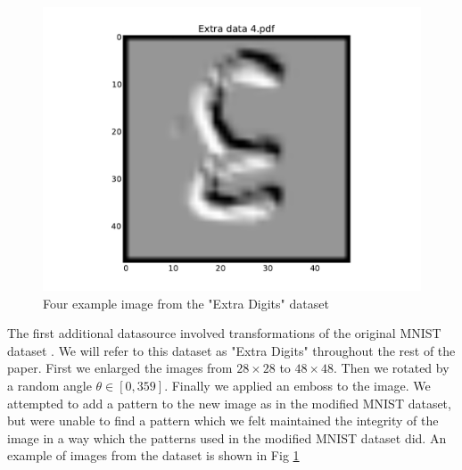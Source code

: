 \documentclass[conference]{IEEEtran}
\begin{document}
\begin{figure}[h]
	\includegraphics[scale=0.20]{Extradata4.pdf}
	\caption{Four example image from the "Extra Digits" dataset}
	\label{ExtraData}
\end{figure}

The first additional datasource involved transformations of the original MNIST dataset \cite{MNIST_Original}. We will refer to this dataset as "Extra Digits" throughout the rest of the paper. First we enlarged the images from $28\times 28$ to $48\times 48$. Then we rotated by a random angle $\theta \in  [0,359]$. Finally we applied an emboss to the image. We attempted to add a pattern to the new image as in the modified MNIST dataset, but were unable to find a pattern which we felt maintained the integrity of the image in a way which the patterns used in the modified MNIST dataset did. An example of images from the dataset is shown in Fig \ref{ExtraData}
\end{document}
